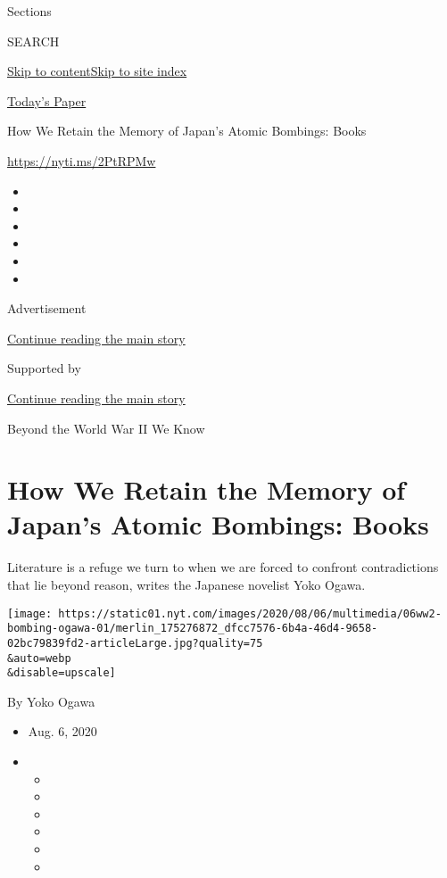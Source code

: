 Sections

SEARCH

\protect\hyperlink{site-content}{Skip to
content}\protect\hyperlink{site-index}{Skip to site index}

\href{https://myaccount.nytimes.com/auth/login?response_type=cookie\&client_id=vi}{}

\href{https://www.nytimes.com/section/todayspaper}{Today's Paper}

How We Retain the Memory of Japan's Atomic Bombings: Books

\href{https://nyti.ms/2PtRPMw}{https://nyti.ms/2PtRPMw}

\begin{itemize}
\item
\item
\item
\item
\item
\item
\end{itemize}

Advertisement

\protect\hyperlink{after-top}{Continue reading the main story}

Supported by

\protect\hyperlink{after-sponsor}{Continue reading the main story}

Beyond the World War II We Know

\hypertarget{how-we-retain-the-memory-of-japans-atomic-bombings-books}{%
\section{How We Retain the Memory of Japan's Atomic Bombings:
Books}\label{how-we-retain-the-memory-of-japans-atomic-bombings-books}}

Literature is a refuge we turn to when we are forced to confront
contradictions that lie beyond reason, writes the Japanese novelist Yoko
Ogawa.

\texttt{[image: https://static01.nyt.com/images/2020/08/06/multimedia/06ww2-bombing-ogawa-01/merlin\_175276872\_dfcc7576-6b4a-46d4-9658-02bc79839fd2-articleLarge.jpg?quality=75\\\&auto=webp\\\&disable=upscale]}

By Yoko Ogawa

\begin{itemize}
\item
  Aug. 6, 2020
\item
  \begin{itemize}
  \item
  \item
  \item
  \item
  \item
  \item
  \end{itemize}
\end{itemize}

